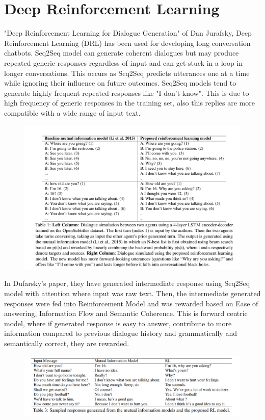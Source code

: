 \documentclass[a4paper,12pt]{report}
\begin{document}
\section{Deep Reinforcement Learning}
"Deep Reinforcement Learning for Dialogue Generation"\cite{jurafskyRL} of  Dan Jurafsky, Deep Reinforcement Learning (DRL) has been used for developing long conversation chatbots. Seq2Seq model can generate coherent dialogues but may produce repeated generic responses regardless of input and can get stuck in a loop in longer conversations. This occurs as Seq2Seq predicts utterances one at a time while ignoring their influence on future outcomes. Seq2Seq models tend to generate highly frequent repeated responses like  "I don't know". This is due to high frequency of generic responses in the training set, also this replies are more compatible with a wide range of input text.
\begin{figure}[H]
\begin{center}
\includegraphics[scale=.5]{DRL1}
\end{center}
\end{figure} 
\noindent In Dufarsky's paper, they have generated intermediate response using Seq2Seq model with attention where input was raw text. Then, the intermediate generated responses were fed into Reinforcement Model and was rewarded based on Ease of answering, Information Flow and Semantic Coherence. This is forward centric model, where if generated response is easy to answer, contribute to more information compared to previous dialogue history and grammatically and semantically correct, they are rewarded.
\begin{figure}[H]
\begin{center}
\includegraphics[scale=0.33]{chatbot_research_conv1}
\end{center}
\end{figure}
\end{document}
